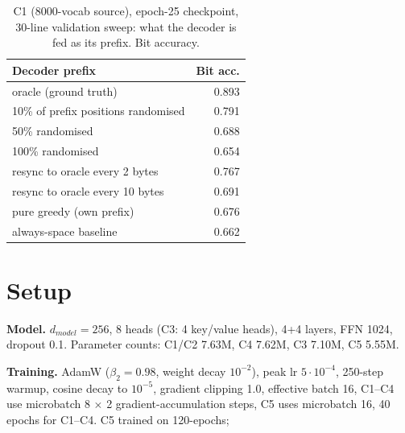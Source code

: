 \documentclass[12pt]{article}
\begin{document}
\begin{table}[t]
\centering\footnotesize
\caption{C1 (8000-vocab source), epoch-25 checkpoint, 30-line validation sweep:
what the decoder is fed as its prefix. Bit accuracy.}
\label{tab:prefix}
\begin{tabular}{lr}
\toprule
Decoder prefix & Bit acc. \\
\midrule
oracle (ground truth)               & 0.893 \\
10\% of prefix positions randomised & 0.791 \\
50\% randomised                     & 0.688 \\
100\% randomised                    & 0.654 \\
resync to oracle every 2 bytes      & 0.767 \\
resync to oracle every 10 bytes     & 0.691 \\
pure greedy (own prefix)            & 0.676 \\
always-space baseline               & 0.662 \\
\bottomrule
\end{tabular}
\end{table}

\section{Setup}
\label{sec:setup}

\textbf{Model.} $d_{model}{=}256$, 8 heads (C3: 4 key/value heads), 4+4 layers,
FFN 1024, dropout 0.1. Parameter counts: C1/C2 7.63M, C4 7.62M, C3 7.10M, C5 5.55M.

\textbf{Training.} AdamW ($\beta_2{=}0.98$, weight decay $10^{-2}$), peak lr
$5\cdot10^{-4}$, 250-step warmup, cosine decay to $10^{-5}$, gradient clipping
1.0, effective batch 16, C1--C4 use microbatch 8 $\times$ 2 gradient-accumulation
steps, C5 uses microbatch 16, 40 epochs for C1--C4. C5 trained on 120-epochs;
\end{document}
